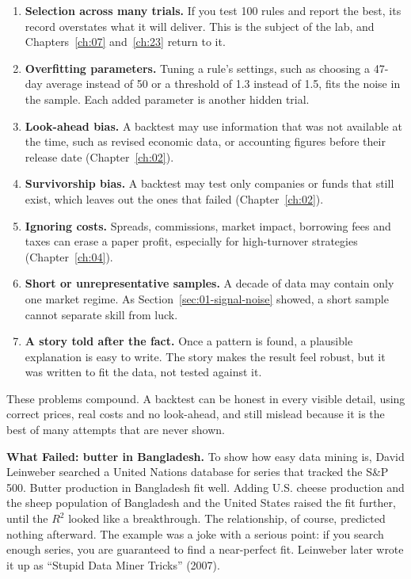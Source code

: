 \begin{enumerate}
  \item \textbf{Selection across many trials.} If you test 100 rules and report the best, its record overstates what it will deliver. This is the subject of the lab, and Chapters~\ref{ch:07} and~\ref{ch:23} return to it.
  \item \textbf{Overfitting parameters.} Tuning a rule's settings, such as choosing a 47-day average instead of 50 or a threshold of 1.3 instead of 1.5, fits the noise in the sample. Each added parameter is another hidden trial.
  \item \textbf{Look-ahead bias.} A backtest may use information that was not available at the time, such as revised economic data, or accounting figures before their release date (Chapter~\ref{ch:02}).
  \item \textbf{Survivorship bias.} A backtest may test only companies or funds that still exist, which leaves out the ones that failed (Chapter~\ref{ch:02}).
  \item \textbf{Ignoring costs.} Spreads, commissions, market impact, borrowing fees and taxes can erase a paper profit, especially for high-turnover strategies (Chapter~\ref{ch:04}).
  \item \textbf{Short or unrepresentative samples.} A decade of data may contain only one market regime. As Section~\ref{sec:01-signal-noise} showed, a short sample cannot separate skill from luck.
  \item \textbf{A story told after the fact.} Once a pattern is found, a plausible explanation is easy to write. The story makes the result feel robust, but it was written to fit the data, not tested against it.
\end{enumerate}

These problems compound. A backtest can be honest in every visible detail, using correct prices, real costs and no look-ahead, and still mislead because it is the best of many attempts that are never shown.

\begin{callout}
\textbf{What Failed: butter in Bangladesh.} To show how easy data mining is, David Leinweber searched a United Nations database for series that tracked the S\&P 500. Butter production in Bangladesh fit well. Adding U.S. cheese production and the sheep population of Bangladesh and the United States raised the fit further, until the $R^2$ looked like a breakthrough. The relationship, of course, predicted nothing afterward. The example was a joke with a serious point: if you search enough series, you are guaranteed to find a near-perfect fit. Leinweber later wrote it up as ``Stupid Data Miner Tricks'' (2007).
\end{callout}

